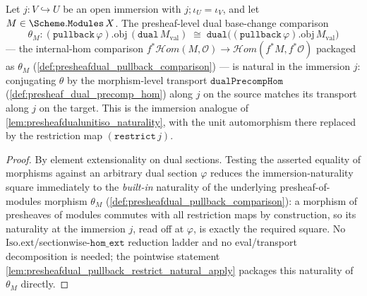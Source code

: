 \begin{lemma}\leanok
  \label{lem:presheafdual_pullback_restrict_natural}
  Let \(j : V \hookrightarrow U\) be an open immersion with \(j \mathbin{;} \iota_U = \iota_V\), and let
  \(M \in \Scheme.\mathtt{Modules}\,X\). The presheaf-level dual base-change comparison
  \[
    \theta_M : (\mathtt{pullback}\,\varphi).\mathrm{obj}\,(\mathtt{dual}\,M_{\mathrm{val}})
      \;\cong\; \mathtt{dual}\bigl((\mathtt{pullback}\,\varphi).\mathrm{obj}\,M_{\mathrm{val}}\bigr)
  \]
  --- the internal-hom comparison
  \(f^{*}\mathcal{H}om(M, \mathcal{O}) \to \mathcal{H}om(f^{*}M, f^{*}\mathcal{O})\) packaged as
  \(\theta_M\) (\cref{def:presheafdual_pullback_comparison}) --- is natural in the immersion
  \(j\): conjugating \(\theta\) by the morphism-level transport \(\mathtt{dualPrecompHom}\)
  (\cref{def:presheaf_dual_precomp_hom}) along \(j\) on the source matches its transport along
  \(j\) on the target. This is the immersion analogue of \cref{lem:presheafdualunitiso_naturality},
  with the unit automorphism there replaced by the restriction map \((\mathtt{restrict}\,j)\).
\end{lemma}
\begin{proof}
  \leanok
  By element extensionality on dual sections. Testing the asserted equality of morphisms against an
  arbitrary dual section \(\varphi\) reduces the immersion-naturality square immediately to the
  \emph{built-in} naturality of the underlying presheaf-of-modules morphism \(\theta_M\)
  (\cref{def:presheafdual_pullback_comparison}): a morphism of presheaves of modules commutes with all
  restriction maps by construction, so its naturality at the immersion \(j\), read off at \(\varphi\),
  is exactly the required square. No \(\mathrm{Iso.ext}\)/sectionwise-\(\mathtt{hom\_ext}\) reduction
  ladder and no eval/transport decomposition is needed; the pointwise statement
  \cref{lem:presheafdual_pullback_restrict_natural_apply} packages this naturality of \(\theta_M\)
  directly.
\end{proof}

